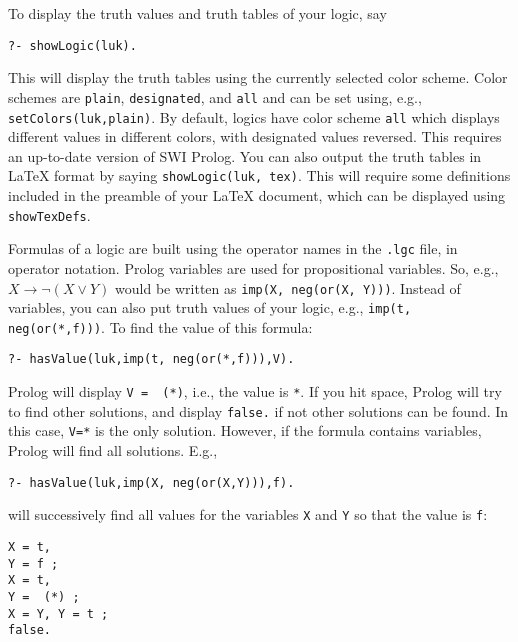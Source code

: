 \documentclass[]{article}
\newcommand{\passthrough}[1]{#1}
\begin{document}
To display the truth values and truth tables of your logic, say

\begin{lstlisting}
?- showLogic(luk).
\end{lstlisting}

This will display the truth tables using the currently selected color
scheme. Color schemes are \passthrough{\lstinline!plain!},
\passthrough{\lstinline!designated!}, and \passthrough{\lstinline!all!}
and can be set using, e.g.,
\passthrough{\lstinline!setColors(luk,plain)!}. By default, logics have
color scheme \passthrough{\lstinline!all!} which displays different
values in different colors, with designated values reversed. This
requires an up-to-date version of SWI Prolog. You can also output the
truth tables in LaTeX format by saying
\passthrough{\lstinline!showLogic(luk, tex)!}. This will require some
definitions included in the preamble of your LaTeX document, which can
be displayed using \passthrough{\lstinline!showTexDefs!}.

Formulas of a logic are built using the operator names in the
\passthrough{\lstinline!.lgc!} file, in operator notation. Prolog
variables are used for propositional variables. So, e.g.,
\(X \to \lnot(X \lor Y)\) would be written as
\passthrough{\lstinline!imp(X, neg(or(X, Y)))!}. Instead of variables,
you can also put truth values of your logic, e.g.,
\passthrough{\lstinline!imp(t, neg(or(*,f)))!}. To find the value of
this formula:

\begin{lstlisting}
?- hasValue(luk,imp(t, neg(or(*,f))),V).
\end{lstlisting}

Prolog will display \passthrough{\lstinline!V =  (*)!}, i.e., the value
is \passthrough{\lstinline!*!}. If you hit space, Prolog will try to
find other solutions, and display \passthrough{\lstinline!false.!} if
not other solutions can be found. In this case,
\passthrough{\lstinline!V=*!} is the only solution. However, if the
formula contains variables, Prolog will find all solutions. E.g.,

\begin{lstlisting}
?- hasValue(luk,imp(X, neg(or(X,Y))),f).
\end{lstlisting}

will successively find all values for the variables
\passthrough{\lstinline!X!} and \passthrough{\lstinline!Y!} so that the
value is \passthrough{\lstinline!f!}:

\begin{lstlisting}
X = t,
Y = f ;
X = t,
Y =  (*) ;
X = Y, Y = t ;
false.
\end{lstlisting}
\end{document}
